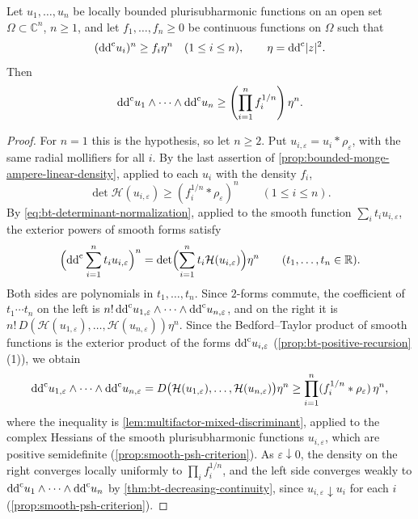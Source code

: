 \begin{corollary}\label{cor:bounded-multifactor-continuous-density}
Let $u_1,\ldots,u_n$ be locally bounded plurisubharmonic functions on an open set $\Omega\subset\mathbb C^n$, $n\geq1$, and let $f_1,\ldots,f_n\geq0$ be continuous functions on $\Omega$ such that
\[
 (\mathrm{dd}^{\mathrm{c}} u_i)^n\geq f_i\eta^n\quad(1\leq i\leq n),
 \qquad\eta=\mathrm{dd}^{\mathrm{c}}|z|^2.
\]
Then
\[
 \mathrm{dd}^{\mathrm{c}} u_1\wedge\cdots\wedge\mathrm{dd}^{\mathrm{c}} u_n
                  \geq\left(\prod_{i=1}^n f_i^{1/n}\right)\eta^n.
\]
\end{corollary}
\begin{proof}
For $n=1$ this is the hypothesis, so let $n\geq2$. Put $u_{i,\varepsilon}=u_i*\rho_\varepsilon$, with the same radial mollifiers for all $i$. By the last assertion of \cref{prop:bounded-monge-ampere-linear-density}, applied to each $u_i$ with the density $f_i$,
\[
 \det\mathcal H(u_{i,\varepsilon})\geq(f_i^{1/n}*\rho_\varepsilon)^n\qquad(1\leq i\leq n).
\]
By \eqref{eq:bt-determinant-normalization}, applied to the smooth function $\sum_it_iu_{i,\varepsilon}$, the exterior powers of smooth forms satisfy
\[
 \Bigl(\mathrm{dd}^{\mathrm{c}}\sum_{i=1}^nt_iu_{i,\varepsilon}\Bigr)^n=\det\Bigl(\sum_{i=1}^nt_i\mathcal H(u_{i,\varepsilon})\Bigr)\eta^n\qquad(t_1,\ldots,t_n\in\mathbb R).
\]
Both sides are polynomials in $t_1,\ldots,t_n$. Since $2$-forms commute, the coefficient of $t_1\cdots t_n$ on the left is $n!\,\mathrm{dd}^{\mathrm{c}} u_{1,\varepsilon}\wedge\cdots\wedge\mathrm{dd}^{\mathrm{c}} u_{n,\varepsilon}$, and on the right it is $n!\,D(\mathcal H(u_{1,\varepsilon}),\ldots,\mathcal H(u_{n,\varepsilon}))\eta^n$. Since the Bedford--Taylor product of smooth functions is the exterior product of the forms $\mathrm{dd}^{\mathrm{c}} u_{i,\varepsilon}$ (\cref{prop:bt-positive-recursion}(1)), we obtain
\[
 \mathrm{dd}^{\mathrm{c}} u_{1,\varepsilon}\wedge\cdots\wedge\mathrm{dd}^{\mathrm{c}} u_{n,\varepsilon}
 =D\bigl(\mathcal H(u_{1,\varepsilon}),\ldots,\mathcal H(u_{n,\varepsilon})\bigr)\eta^n
 \geq\prod_{i=1}^n(f_i^{1/n}*\rho_\varepsilon)\,\eta^n,
\]
where the inequality is \cref{lem:multifactor-mixed-discriminant}, applied to the complex Hessians of the smooth plurisubharmonic functions $u_{i,\varepsilon}$, which are positive semidefinite (\cref{prop:smooth-psh-criterion}). As $\varepsilon\downarrow0$, the density on the right converges locally uniformly to $\prod_if_i^{1/n}$, and the left side converges weakly to $\mathrm{dd}^{\mathrm{c}} u_1\wedge\cdots\wedge\mathrm{dd}^{\mathrm{c}} u_n$ by \cref{thm:bt-decreasing-continuity}, since $u_{i,\varepsilon}\downarrow u_i$ for each $i$ (\cref{prop:smooth-psh-criterion}).
\end{proof}
